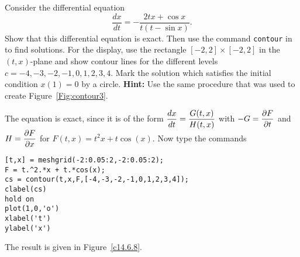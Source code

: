 \documentclass{ximera}
\begin{document}
\begin{computerExercise} \label{c14.6.8}
Consider the differential equation
\[
\frac{dx}{dt} = -\frac{2tx+\cos x}{t(t-\sin x)}.
\]
Show that this differential equation is 
exact.  Then use the command {\tt contour} in \Matlab 
to find solutions.  For the display, 
use the rectangle $[-2,2]\times [-2,2]$ in the $(t,x)$-plane and show contour
lines for the different levels $c=-4,-3,-2,-1,0,1,2,3,4$.  Mark the solution
which satisfies the initial condition $x(1)=0$ by a circle.
{\bf Hint:} Use the same procedure that was used to create 
Figure~\ref{Fig:contour3}.

\begin{solution}
The equation is exact, since it is of the form
$\displaystyle\frac{dx}{dt} = \frac{G(t,x)}{H(t,x)}$ with
$-G=\displaystyle\frac{\partial F}{\partial t}$ and
$H=\displaystyle\frac{\partial F}{\partial x}$ for $F(t,x) = t^2 x + t\cos(x)$.
Now type the commands
\begin{verbatim}
[t,x] = meshgrid(-2:0.05:2,-2:0.05:2);
F = t.^2.*x + t.*cos(x);
cs = contour(t,x,F,[-4,-3,-2,-1,0,1,2,3,4]);
clabel(cs)
hold on
plot(1,0,'o')
xlabel('t')
ylabel('x')
\end{verbatim}
The result is given in Figure~\ref{c14.6.8}.
\begin{figure}[htb]
     \centerline{%
     }
\end{figure} 




\end{solution}
\end{computerExercise}
\end{document}
